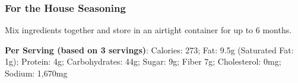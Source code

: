 \subsubsection{For the House Seasoning}
Mix ingredients together and store in an airtight container for up to 6 months.

\vspace{2em}

\noindent\textbf{Per Serving (based on 3 servings)}: Calories: 273; Fat: 9.5g (Saturated Fat: 1g); Protein: 4g; Carbohydrates: 44g; Sugar: 9g; Fiber 7g; Cholesterol: 0mg; Sodium: 1,670mg
